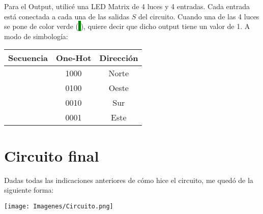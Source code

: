 \documentclass[a4paper,12pt]{article}
\begin{document}
Para el Output, utilicé una LED Matrix de 4 luces y 4 entradas. Cada entrada está conectada a cada una de las salidas $S$ del circuito. Cuando una de las 4 luces se pone de color verde (\colorbox{green}{ }), quiere decir que dicho output tiene un valor de 1. A modo de simbología:
\begin{center}
\begin{tabular}{c|c|c}
    Secuencia & One-Hot & Dirección\\
    \hline
    \colorbox{green}{ }\colorbox{black}{ }\colorbox{black}{ }\colorbox{black}{ } & 1000 & Norte \\
    \colorbox{black}{ }\colorbox{green}{ }\colorbox{black}{ }\colorbox{black}{ } & 0100 & Oeste \\
    \colorbox{black}{ }\colorbox{black}{ }\colorbox{green}{ }\colorbox{black}{ } & 0010 & Sur \\
    \colorbox{black}{ }\colorbox{black}{ }\colorbox{black}{ }\colorbox{green}{ } & 0001 & Este \\
\end{tabular}
\end{center}

\newpage

\section{Circuito final}
Dadas todas las indicaciones anteriores de cómo hice el circuito, me quedó de la siguiente forma:

\begin{minipage}[t]{1\linewidth}
    \vspace{2ex}
    \begin{center}
        \texttt{[image: Imagenes/Circuito.png]}
    \end{center}
    
\end{minipage}
    
\end{document}
